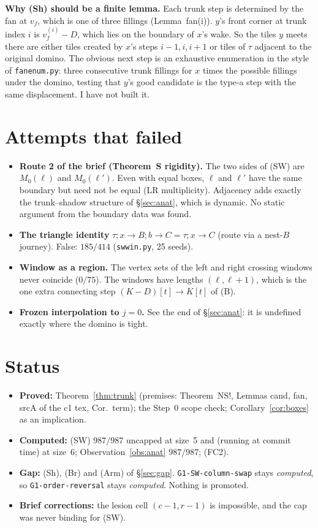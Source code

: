 \documentclass[11pt]{article}
\theoremstyle{definition}\newtheorem{definition}[theorem]{Definition}\newtheorem{remark}[theorem]{Remark}
\newcommand{\toB}{\!\to\! B}\newcommand{\toC}{\!\to\! C}\newcommand{\fa}{\mathfrak a}
\begin{document}
\textbf{Why (Sh) should be a finite lemma.} Each trunk step is determined by the fan at $v_f$, which is one of three fillings
(Lemma~fan(i)). $y$'s front corner at trunk index $i$ is $v_f^{(i)}-D$, which lies on the boundary of $x$'s wake. So the tiles $y$ meets
there are either tiles created by $x$'s steps $i-1,i,i+1$ or tiles of $\tau$ adjacent to the original domino. The obvious next step is
an exhaustive enumeration in the style of \texttt{fanenum.py}: three consecutive trunk fillings for $x$ times the possible fillings
under the domino, testing that $y$'s good candidate is the type-a step with the same displacement. I have not built it.

\section{Attempts that failed}\label{sec:dead}
\begin{itemize}
\item \textbf{Route 2 of the brief (Theorem~S rigidity).} The two sides of (SW) are $M_0(\ell)$ and $M_0(\ell')$. Even with equal boxes,
$\ell$ and $\ell'$ have the same boundary but need not be equal (LR multiplicity). Adjacency adds exactly the trunk--shadow structure of
\S\ref{sec:anat}, which is dynamic. No static argument from the boundary data was found.
\item \textbf{The triangle identity} $\tau;x\toB;b\to C=\tau;x\toC$ (route via a nest-$B$ journey). False: $185/414$ (\texttt{swwin.py}, 25 seeds).
\item \textbf{Window as a region.} The vertex sets of the left and right crossing windows never coincide ($0/75$). The windows have
lengths $(\ell,\ell+1)$, which is the one extra connecting step $(K-D)[t]\to K[t]$ of (B).
\item \textbf{Frozen interpolation to $j=0$.} See the end of \S\ref{sec:anat}: it is undefined exactly where the domino is tight.
\end{itemize}

\section{Status}
\begin{itemize}
\item \textbf{Proved:} Theorem~\ref{thm:trunk} (premises: Theorem~NS!, Lemmas cand, fan, srcA of the c1 tex, Cor.~term); the Step~0
scope check; Corollary~\ref{cor:boxes} as an implication.
\item \textbf{Computed:} (SW) $987/987$ uncapped at size~5 and (running at commit time) at size~6; Observation~\ref{obs:anat} $987/987$; (FC2).
\item \textbf{Gap:} (Sh), (Br) and (Arm) of \S\ref{sec:gap}. \texttt{G1-SW-column-swap} stays \emph{computed}, so
\texttt{G1-order-reversal} stays \emph{computed}. Nothing is promoted.
\item \textbf{Brief corrections:} the lesion cell $(c-1,r-1)$ is impossible, and the cap was never binding for (SW).
\end{itemize}
\end{document}
